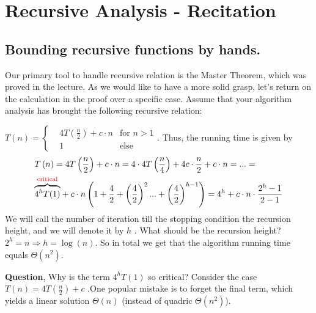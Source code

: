 

\setcounter{chapter}{2}
\chapter{Recursive Analysis - Recitation} 
% 
%

\section{Bounding recursive functions by hands.} Our primary tool to handle recursive relation is the Master Theorem, which was proved in the lecture. As we would like to have a more solid grasp, let's return on the calculation in the proof over a specific case. 
Assume that your algorithm analysis has brought the following recursive relation:
    \begin{example}\( T\left(n\right)  = \left\{ \begin{array}{rcl}
& 4T\left(\frac{n}{2}\right)+c\cdot n & \mbox{for }  n > 1  \\
& 1 & \mbox{else}  
\end{array}\right. \). Thus, the running time is given by \begin{equation*}
    \begin{split}
 & T\left(n\right)  = 4T\left(\frac{n}{2}\right)+c\cdot n=  4\cdot4T\left(\frac{n}{4}\right)+4c\cdot\frac{n}{2}+c\cdot n = ... = \\ & \overset{\text{\textcolor{red}{critical}}}{\overbrace{4^{h}T(1)}} + c\cdot n\left(1+\frac{4}{2}+\left(\frac{4}{2}\right)^{2}...+\left(\frac{4}{2}\right)^{h-1}\right) = 4^{h} + c\cdot n\cdot\frac{2^{h}-1}{2-1}
    \end{split}
\end{equation*}
We will call the number of iteration till the stopping condition the recursion height, and we will denote it by \(h\) . What should be the recursion height? \( 2^{h} = n \Rightarrow h =\log\left(n\right) \). So in total we get that the algorithm running time equals \( \Theta\left(n^2\right)\). 
\end{example}
\textbf{Question}, Why is the term \( 4^{h} T(1) \) so critical? Consider the case \(T\left(n\right) =  4T\left(\frac{n}{2}\right) + c \) .One popular mistake is to forget the final term, which yields a linear solution \( \Theta(n)\) (instead of quadric \( \Theta(n^2)\)).   

